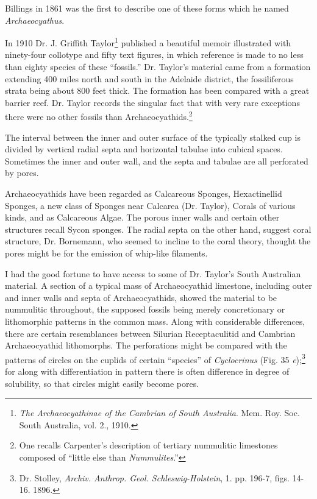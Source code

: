 \documentclass[a4paper, 12pt, oneside]{article}
\begin{document}
Billings in 1861 was the first to describe one of these forms which he named \emph{Archaeocyathus}.

In 1910 Dr. J. Griffith Taylor\footnote{\emph{The Archaeocyathinae of the Cambrian of South Australia}. Mem. Roy. Soc. South Australia, vol. 2., 1910.} published a beautiful memoir illustrated with ninety-four collotype and fifty text figures, in which reference is made to no less than eighty species of these ``fossils.'' Dr. Taylor's material came from a formation extending 400 miles north and south in the Adelaide district, the fossiliferous strata being about 800 feet thick. The formation has been compared with a great barrier reef. Dr. Taylor records the singular fact that with very rare exceptions there were no other fossils than Archaeocyathids.\footnote{One recalls Carpenter's description of tertiary nummulitic limestones composed of ``little else than \emph{Nummulites}.''}

The interval between the inner and outer surface of the typically stalked cup is divided by vertical radial septa and horizontal tabulae into cubical spaces. Sometimes the inner and outer wall, and the septa and tabulae are all perforated by pores.

Archaeocyathids have been regarded as Calcareous Sponges, Hexactinellid Sponges, a new class of Sponges near Calcarea (Dr. Taylor), Corals of various kinds, and as Calcareous Algae. The porous inner walls and certain other structures recall Sycon sponges. The radial septa on the other hand, suggest coral structure, Dr. Bornemann, who seemed to incline to the coral theory, thought the pores might be for the emission of whip-like filaments.

I had the good fortune to have access to some of Dr. Taylor's South Australian material. A section of a typical mass of Archaeocyathid limestone, including outer and inner walls and septa of Archaeocyathids, showed the material to be nummulitic throughout, the supposed fossils being merely concretionary or lithomorphic patterns in the common mass. Along with considerable differences, there are certain resemblances between Silurian Receptaculitid and Cambrian Archaeocyathid lithomorphs. The perforations might be compared with the patterns of circles on the cuplids of certain ``species'' of \emph{Cyclocrinus} (Fig. 35 \emph{e});\footnote{Dr. Stolley, \emph{Archiv. Anthrop. Geol. Schleswig-Holstein}, 1. pp. 196-7, figs. 14-16. 1896.} for along with differentiation in pattern there is often difference in degree of solubility, so that circles might easily become pores.
\end{document}
